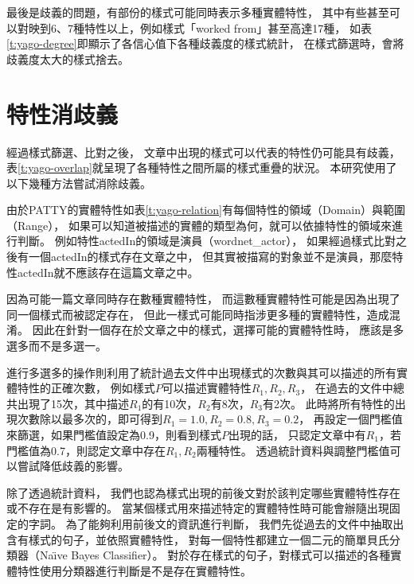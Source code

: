 最後是歧義的問題，有部份的樣式可能同時表示多種實體特性，
其中有些甚至可以對映到6、7種特性以上，例如樣式「worked from」甚至高達17種，
如表\ref{t:yago-degree}即顯示了各信心值下各種歧義度的樣式統計，
在樣式篩選時，會將歧義度太大的樣式捨去。



\section{特性消歧義}
\label{s:pattern-disambiguity}

經過樣式篩選、比對之後，
文章中出現的樣式可以代表的特性仍可能具有歧義，
表\ref{t:yago-overlap}就呈現了各種特性之間所屬的樣式重疊的狀況。
本研究使用了以下幾種方法嘗試消除歧義。



由於PATTY的實體特性如表\ref{t:yago-relation}有每個特性的領域（Domain）與範圍（Range），
如果可以知道被描述的實體的類型為何，就可以依據特性的領域來進行判斷。
例如特性actedIn的領域是演員（wordnet\_actor），
如果經過樣式比對之後有一個actedIn的樣式存在文章之中，
但其實被描寫的對象並不是演員，那麼特性actedIn就不應該存在這篇文章之中。

因為可能一篇文章同時存在數種實體特性，
而這數種實體特性可能是因為出現了同一個樣式而被認定存在，
但此一樣式可能同時指涉更多種的實體特性，造成混淆。
因此在針對一個存在於文章之中的樣式，選擇可能的實體特性時，
應該是多選多而不是多選一。

進行多選多的操作則利用了統計過去文件中出現樣式的次數與其可以描述的所有實體特性的正確次數，
例如樣式$P$可以描述實體特性$R_1, R_2, R_3$，
在過去的文件中總共出現了15次，其中描述$R_1$的有10次，$R_2$有8次，$R_3$有2次。
此時將所有特性的出現次數除以最多次的，即可得到$R_1=1.0, R_2=0.8, R_3 = 0.2$，
再設定一個門檻值來篩選，如果門檻值設定為0.9，則看到樣式$P$出現的話，
只認定文章中有$R_1$，若門檻值為0.7，則認定文章中存在$R_1,R_2$兩種特性。
透過統計資料與調整門檻值可以嘗試降低歧義的影響。

除了透過統計資料，
我們也認為樣式出現的前後文對於該判定哪些實體特性存在或不存在是有影響的。
當某個樣式用來描述特定的實體特性時可能會辦隨出現固定的字詞。
為了能夠利用前後文的資訊進行判斷，
我們先從過去的文件中抽取出含有樣式的句子，並依照實體特性，
對每一個特性都建立一個二元的簡單貝氏分類器（Na\"{\i}ve Bayes Classifier）。
對於存在樣式的句子，對樣式可以描述的各種實體特性使用分類器進行判斷是不是存在實體特性。

